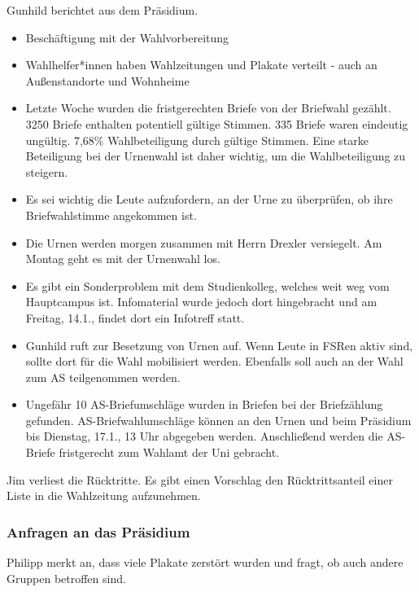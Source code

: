 \documentclass[ngerman,headheight=70pt]{scrartcl}
\begin{document}
    Gunhild berichtet aus dem Präsidium.

    \begin{itemize}
        \item Beschäftigung mit der Wahlvorbereitung
        \item Wahlhelfer*innen haben Wahlzeitungen und Plakate verteilt - auch
              an Außenstandorte und Wohnheime
        \item Letzte Woche wurden die fristgerechten Briefe von der Briefwahl
              gezählt. 3250 Briefe enthalten potentiell gültige Stimmen. 335 Briefe
              waren eindeutig ungültig. 7,68\% Wahlbeteiligung durch gültige
              Stimmen. Eine starke Beteiligung bei der Urnenwahl ist daher
              wichtig, um die Wahlbeteiligung zu steigern.
        \item Es sei wichtig die Leute aufzufordern, an der Urne zu überprüfen, ob
              ihre Briefwahlstimme angekommen ist.
        \item Die Urnen werden morgen zusammen mit Herrn Drexler versiegelt. Am
              Montag geht es mit der Urnenwahl los.
        \item Es gibt ein Sonderproblem mit dem Studienkolleg, welches weit weg
              vom Hauptcampus ist. Infomaterial wurde jedoch dort hingebracht
              und am Freitag, 14.1., findet dort ein Infotreff statt.
        \item Gunhild ruft zur Besetzung von Urnen auf. Wenn Leute in FSRen aktiv
              sind, sollte dort für die Wahl mobilisiert werden. Ebenfalls soll
              auch an der Wahl zum AS teilgenommen werden.
        \item Ungefähr 10 AS-Briefumschläge wurden in Briefen bei der Briefzählung
              gefunden. AS-Briefwahlumschläge können an den Urnen und beim Präsidium
              bis Dienstag, 17.1., 13 Uhr abgegeben werden. Anschließend werden
              die AS-Briefe fristgerecht zum Wahlamt der Uni gebracht.
    \end{itemize}

    Jim verliest die Rücktritte. Es gibt einen Vorschlag den Rücktrittsanteil einer
    Liste in die Wahlzeitung aufzunehmen.

    \subsubsection{Anfragen an das Präsidium}

    Philipp merkt an, dass viele Plakate zerstört wurden und fragt, ob auch andere
    Gruppen betroffen sind.
\end{document}
